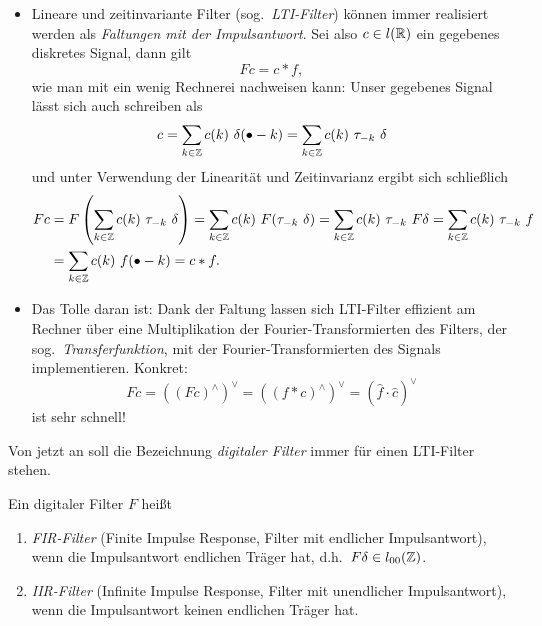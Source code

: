 \begin{remark}\leavevmode
\begin{itemize}
\item Lineare und zeitinvariante Filter (sog.\ \emph{LTI-Filter}) können immer realisiert 
werden als \emph{Faltungen mit der Impulsantwort}. Sei also $ c \in l(\mathbb{R}) $ ein gegebenes diskretes 
Signal, dann gilt
\[
  Fc = c * f,
\]
wie man mit ein wenig Rechnerei nachweisen kann: Unser gegebenes Signal lässt sich auch schreiben
als
\[
  c = \sum_{k \in \Z} c(k) \ \delta(\bullet - k) = \sum_{k \in \Z} c(k) \ \tau_{-k} \ \delta
\]
und unter Verwendung der Linearität und Zeitinvarianz ergibt sich schließlich
\begin{align*}
   Fc
&= F \left( \sum_{k \in \mathbb{Z}} c(k) \ \tau_{-k} \ \delta \right) 
 = \sum_{k \in \mathbb{Z}} c(k) \ F(\tau_{-k} \ \delta)
 = \sum_{k \in \mathbb{Z}} c(k) \ \tau_{-k} \ F \delta
 = \sum_{k \in \mathbb{Z}} c(k) \ \tau_{-k} \ f \\
&= \sum_{k \in \mathbb{Z}} c(k) \ f(\bullet - k) = c * f.
\end{align*}
\item Das Tolle daran ist: Dank der Faltung lassen sich LTI-Filter effizient am Rechner über eine 
Multiplikation der Fourier-Transformierten des Filters, der sog.\ \emph{Transferfunktion}, mit
der Fourier-Transformierten des Signals implementieren. Konkret:
\[
  Fc = \left( (Fc)^{\wedge} \right)^{\vee} = \left( (f * c)^{\wedge} \right)^{\vee}
     = \left( \widehat{f} \cdot \widehat{c} \right)^{\vee}
\]
ist sehr schnell!
\end{itemize}
\end{remark}

Von jetzt an soll die Bezeichnung \emph{digitaler Filter} immer für einen LTI-Filter stehen.

\begin{definition}
Ein digitaler Filter $ F $ heißt
\begin{enumerate}
\item \emph{FIR-Filter} (Finite Impulse Response, Filter mit endlicher Impulsantwort), wenn die
  Impulsantwort endlichen Träger hat, d.h.\ $ F\delta \in l_{00}(\mathbb{Z}) $.
\item \emph{IIR-Filter} (Infinite Impulse Response, Filter mit unendlicher Impulsantwort), wenn die
  Impulsantwort keinen endlichen Träger hat.
\end{enumerate}
\end{definition}

\begin{example}
\end{example}